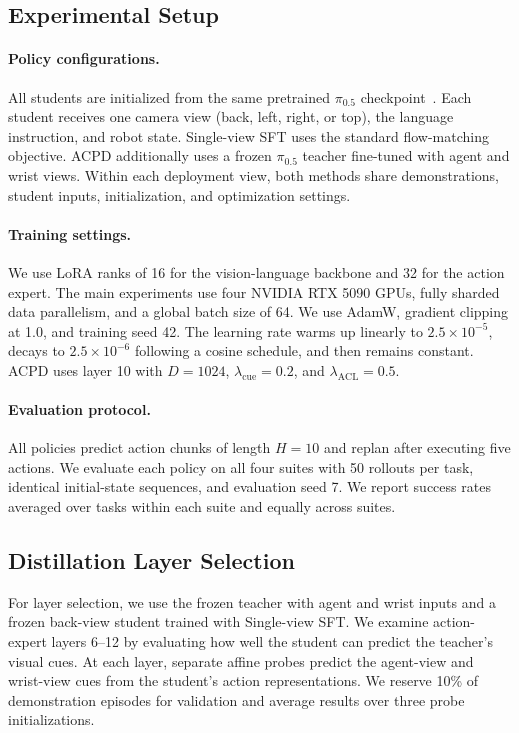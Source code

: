 \documentclass{ELSP}
\begin{document}
\subsection{Experimental Setup}

\paragraph{Policy configurations.}
All students are initialized from the same pretrained
$\pi_{0.5}$ checkpoint~\cite{pmlr-v305-black25a}.
Each student receives one camera view (back, left, right,
or top), the language instruction, and robot state.
Single-view SFT uses the standard flow-matching objective.
ACPD additionally uses a frozen $\pi_{0.5}$ teacher
fine-tuned with agent and wrist views.
Within each deployment view, both methods share demonstrations,
student inputs, initialization, and optimization settings.

\paragraph{Training settings.}
We use LoRA ranks of 16 for the vision-language backbone
and 32 for the action expert.
The main experiments use four NVIDIA RTX 5090 GPUs, fully sharded
data parallelism, and a global batch size of 64.
We use AdamW, gradient clipping at 1.0, and training seed 42.
The learning rate warms up linearly to $2.5\times10^{-5}$,
decays to $2.5\times10^{-6}$ following a cosine schedule,
and then remains constant.
ACPD uses layer 10 with $D=1024$,
$\lambda_{\mathrm{cue}}=0.2$, and
$\lambda_{\mathrm{ACL}}=0.5$.

\paragraph{Evaluation protocol.}
All policies predict action chunks of length $H=10$
and replan after executing five actions.
We evaluate each policy on all four suites with
50 rollouts per task, identical initial-state sequences,
and evaluation seed 7.
We report success rates averaged over tasks within
each suite and equally across suites.


\subsection{Distillation Layer Selection}
\label{sec:layer_selection}

For layer selection, we use the frozen teacher with
agent and wrist inputs and a frozen back-view student
trained with Single-view SFT. We examine action-expert
layers 6--12 by evaluating how well the student can
predict the teacher's visual cues.
At each layer, separate affine probes predict the agent-view
and wrist-view cues from the student's action representations.
We reserve 10\% of demonstration episodes for
validation and average results over three probe initializations.
\end{document}
